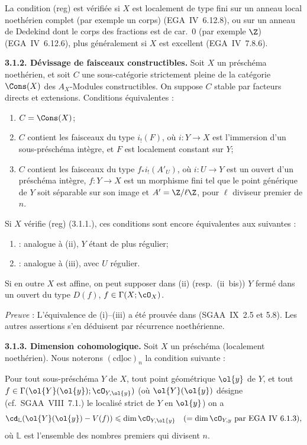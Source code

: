 La condition (reg) est vérifiée si $X$ est localement de type fini sur un anneau local noethérien complet (par exemple un corps) (EGA~IV~6.12.8), ou sur un anneau de Dedekind dont le corps des fractions est de car.~0 (par exemple $\Z$) (EGA~IV~6.12.6), plus généralement si $X$ est excellent (EGA~IV~7.8.6).

\textbf{3.1.2. Dévissage de faisceaux constructibles.} Soit $X$ un préschéma noethérien, et soit $C$ une sous-catégorie strictement pleine de la catégorie $\Cons(X)$ des $A_X$-Modules constructibles. On suppose $C$ stable par facteurs directs et extensions. Conditions équivalentes :
\begin{enumerate}
\item[(i)] $C = \Cons(X)$;
\item[(ii)] $C$ contient les faisceaux du type $i_{!}(F)$, où $i : Y \to X$ est l'immersion d'un sous-préschéma intègre, et $F$ est localement constant sur $Y$;
\item[(iii)] $C$ contient les faisceaux du type $f_{*}i_{!}(A'_U)$, où $i : U \to Y$ est un ouvert d'un préschéma intègre, $f : Y \to X$ est un morphisme fini tel que le point générique de $Y$ soit séparable sur son image et $A' = \Z/\ell\Z$, pour $\ell$ diviseur premier de $n$.
\end{enumerate}
Si $X$ vérifie (reg) (3.1.1.), ces conditions sont encore équivalentes aux suivantes :
\begin{enumerate}
\item[(ii~bis)] : analogue à (ii), $Y$ étant de plus régulier;
\item[(iii~bis)] : analogue à (iii), avec $U$ régulier.
\end{enumerate}
Si en outre $X$ est affine, on peut supposer dans (ii) (resp.~(ii~bis)) $Y$ fermé dans un ouvert du type $D(f)$, $f \in \Gamma(X; \cO_X)$.

\emph{Preuve} : L'équivalence de (i)--(iii) a été prouvée dans (SGAA~IX~2.5 et 5.8). Les autres assertions s'en déduisent par récurrence noethérienne.

\textbf{3.1.3. Dimension cohomologique.} Soit $X$ un préschéma (localement noethérien). Nous noterons $(\underline{\mathrm{cdloc}})_n$ la condition suivante :

Pour tout sous-préschéma $Y$ de $X$, tout point géométrique $\ol{y}$ de $Y$, et tout 
$f \in \Gamma(\ol{Y}(\ol{y}); \cO_{Y,\ol{y}})$ (où $\ol{Y}(\ol{y})$
désigne (cf.~SGAA~VIII~7.1.) le localisé strict de $Y$ en $\ol{y}$) on a
\[
\cd_{\mathbb{L}}(\ol{Y}(\ol{y}) - V(f)) \leqslant \dim \cO_{Y,\ol{y}} \quad (= \dim \cO_{Y,y} \text{ par EGA~IV~6.1.3}),
\]
où $\mathbb{L}$ est l'ensemble des nombres premiers qui divisent $n$.

